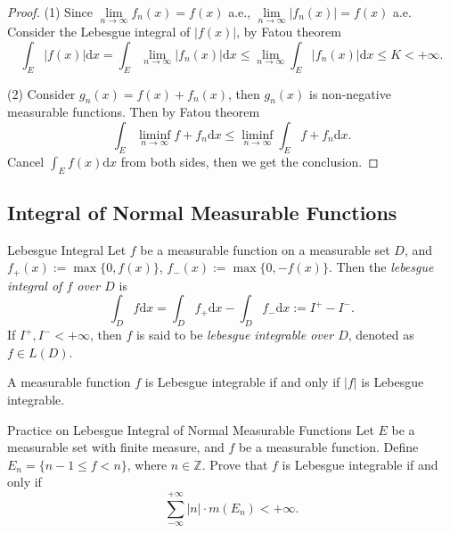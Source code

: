 \begin{proof}
  (1) Since $\lim \limits _{n \rightarrow \infty} f_n(x) = f(x)$ a.e.,
  $\lim \limits _{n \rightarrow \infty} |f_n(x)| = f(x)$ a.e.
  Consider the Lebesgue integral of $|f(x)|$, by Fatou theorem
  \begin{equation}
    \int_E |f(x)|\mathrm{d} x = \int_E \lim \limits _{n \rightarrow \infty} |f_n(x)| \mathrm{d} x
    \leq \lim \limits _{n \rightarrow \infty} \int_E |f_n(x)|\mathrm{d} x \leq K < +\infty.
  \end{equation}

  (2) Consider $g_n(x) = f(x) + f_n(x)$, then $g_n(x)$ is non-negative measurable functions.
  Then by Fatou theorem
  \begin{equation}
    \int_E \liminf_{n \rightarrow \infty} f + f_n \mathrm{d} x
    \leq \liminf_{n \rightarrow \infty} \int_E f + f_n \mathrm{d} x.
  \end{equation}
  Cancel $\int_E f(x)\mathrm{d} x$ from both sides, then we get the conclusion.
\end{proof}

\subsection{Integral of Normal Measurable Functions}

\begin{definition}{Lebesgue Integral}{}
  Let $f$ be a measurable function on a measurable set $D$,
  and $f_+(x) := \max\{0, f(x)\}$, $f_-(x) := \max\{0, -f(x)\}$.
  Then the \emph{lebesgue integral of $f$ over $D$} is
  \begin{equation}
    \int_D f \mathrm{d} x 
    = \int_D f_+ \mathrm{d} x - \int_D f_-\mathrm{d} x
    := I^+ - I^-.
  \end{equation}
  If $I^+, I^- < +\infty$, then $f$ is said to be \emph{lebesgue integrable over
    $D$}, denoted as $f \in L(D)$.
\end{definition}

\begin{note}
  A measurable function $f$ is Lebesgue integrable if and only if $|f|$
  is Lebesgue integrable.
\end{note}

\begin{example}{Practice on Lebesgue Integral of Normal Measurable Functions}{}
  Let $E$ be a measurable set with finite measure, and $f$ be a measurable function.
  Define $E_n = \{n - 1 \leq f < n\}$, where $n \in \mathbb{Z}$.
  Prove that $f$ is Lebesgue integrable if and only if
  \begin{equation}
    \sum\limits_{- \infty}^{+\infty} |n| \cdot m(E_n) < +\infty.
  \end{equation}
\end{example}

